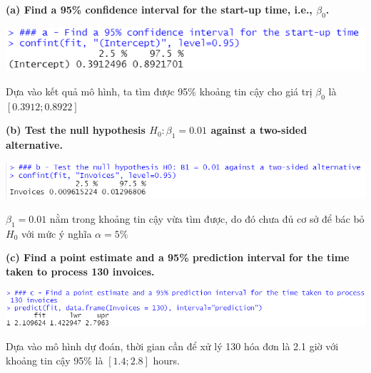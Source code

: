 \documentclass[a4paper]{article}
\theoremstyle{nonumberplain}
\begin{document}
\textbf{(a) Find a 95\% confidence interval for the start-up time, i.e., $\beta_0$.}

\begin{center}
\includegraphics[scale = 0.8]{3a.PNG} 
\end{center}

Dựa vào kết quả mô hình, ta tìm được 95\% khoảng tin cậy cho giá trị $\beta_0$ là $[0.3912;0.8922]$

\textbf{(b) Test the null hypothesis
$H_0: \beta_1 = 0.01$ against a two-sided alternative.}

\begin{center}
\includegraphics[scale = 0.8]{3b.PNG} 
\end{center}
$\beta_1 = 0.01$ nằm trong khoảng tin cậy vừa tìm được, do đó chưa đủ cơ sở để bác bỏ $H_0$ với mức ý nghĩa $\alpha = 5\%$ 

\textbf{(c) Find a point estimate and a 95\% prediction interval for the time taken to process 130 invoices.}

\begin{center}
\includegraphics[scale = 0.8]{3c.PNG} 
\end{center}
Dựa vào mô hình dự đoán, thời gian cần để xử lý 130 hóa đơn là 2.1 giờ với khoảng tin cậy 95\% là $[1.4; 2.8]$ hours.
\end{document}
